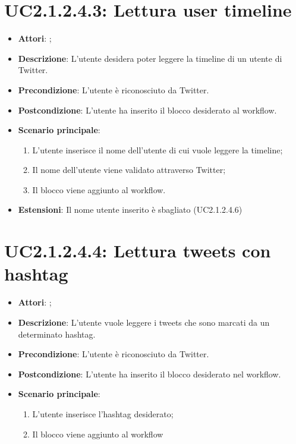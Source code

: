 \section{UC2.1.2.4.3: Lettura user timeline}
\label{UC2.1.2.4.3}
\begin{itemize}
	\item \textbf{Attori}: ;
	\item \textbf{Descrizione}: L'utente desidera poter leggere la timeline di un utente di Twitter.
	\item \textbf{Precondizione}: L'utente è riconosciuto da Twitter.
	\item \textbf{Postcondizione}: L'utente ha inserito il blocco desiderato al workflow.
	\item \textbf{Scenario principale}:
	\begin{enumerate} \item L'utente inserisce il nome dell'utente di cui vuole leggere la timeline;  \item  Il nome dell'utente viene validato attraverso Twitter;  \item  Il blocco viene aggiunto al workflow.\end{enumerate}
	\item \textbf{Estensioni}:
	Il nome utente inserito è sbagliato (UC2.1.2.4.6)
\end{itemize}

\section{UC2.1.2.4.4: Lettura tweets con hashtag}
\label{UC2.1.2.4.4}
\begin{itemize}
	\item \textbf{Attori}: ;
	\item \textbf{Descrizione}: L'utente vuole leggere i tweets che sono marcati da un determinato hashtag.
	\item \textbf{Precondizione}: L'utente è riconosciuto da Twitter.
	\item \textbf{Postcondizione}: L'utente ha inserito il blocco desiderato nel workflow.
	\item \textbf{Scenario principale}:
	\begin{enumerate} \item L'utente inserisce l'hashtag desiderato;  \item  Il blocco viene aggiunto al workflow\end{enumerate}
\end{itemize}

